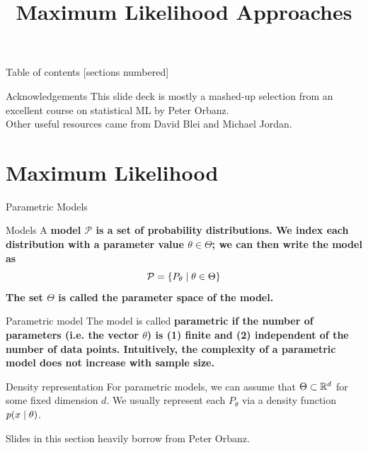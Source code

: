 \documentclass[10pt]{beamer}
\title{Maximum Likelihood Approaches}
\begin{document}
\maketitle

\begin{frame}{Table of contents}
  [sections numbered]
  \tableofcontents[hideallsubsections]
\end{frame}

\begin{frame}{Acknowledgements}
This slide deck is mostly a mashed-up selection from an excellent course on statistical ML by Peter Orbanz.  \\
\vfill
Other useful resources came from David Blei and Michael Jordan.
\end{frame}


\section{Maximum Likelihood}

\begin{frame}{Parametric Models}

\begin{sblock}{Models}
A \bf{model} $\mathcal{P}$ is a set of probability distributions.  We index each distribution with a parameter value $\theta \in \Theta$; we can then write the model as
\[ \mathcal{P} = \{ {P_\theta \; | \; \theta \in \Theta} \} \]
The set $\Theta$ is called the \bf{parameter space} of the model.
\end{sblock}

\begin{sblock}{Parametric model}
The model is called \bf{parametric} if the number of parameters (i.e. the vector $\theta$) is (1) finite and (2) independent of the number of data points.   Intuitively, the complexity of a parametric model does not increase with sample size.
\end{sblock}


\begin{sblock}{Density representation}
For parametric models, we can assume that $\Theta \subset \mathbb{R}^d$ for some fixed dimension $d$.   We usually represent each $P_\theta$ via a density function $p(x \; | \; \theta)$.
\end{sblock}
\hfill \tiny Slides in this section heavily borrow from Peter Orbanz.
\end{frame}
\end{document}
